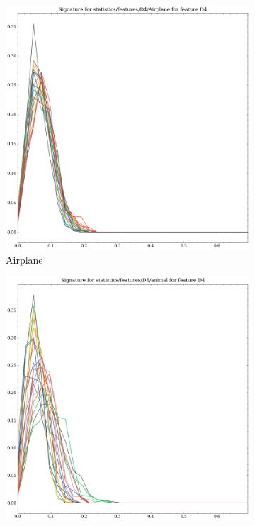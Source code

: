 \begin{figure}[t!p]
    \centering
    \begin{subfigure}[b]{0.23\textwidth}
        \includegraphics[width=\textwidth]{assets/feature_extraction/D4/Airplane.png}
        \caption{Airplane}
    \end{subfigure}
    \hfill
    \begin{subfigure}[b]{0.23\textwidth}
        \includegraphics[width=\textwidth]{assets/feature_extraction/D4/animal.png}

\end{subfigure}
\end{figure}
